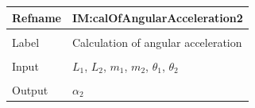 \documentclass[12pt]{article}
\begin{document}
\vspace{\baselineskip}
\noindent
\begin{minipage}{\textwidth}
\begin{tabular}{>{\raggedright}p{}>{\raggedright\arraybackslash}p{}}
\toprule \textbf{Refname} & \textbf{IM:calOfAngularAcceleration2}
\label{IM:calOfAngularAcceleration2}
\\ \midrule \\
Label & Calculation of angular acceleration
        
\\ \midrule \\
Input & ${L_{1}}$, ${L_{2}}$, ${m_{1}}$, ${m_{2}}$, ${θ_{1}}$, ${θ_{2}}$
        
\\ \midrule \\
Output & ${α_{2}}$
         

\end{tabular}
\end{minipage}
\end{document}
